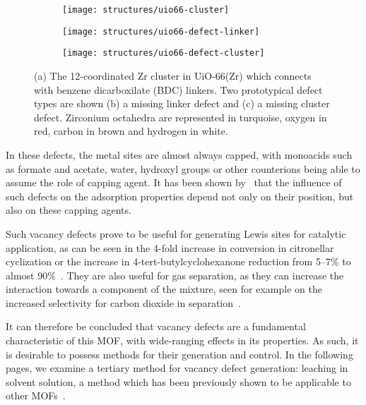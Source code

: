 \begin{figure}[htb]
	\centering

	\begin{subfigure}[b]{0.3\linewidth}
		\parbox[c]{0.15\linewidth}{\caption{}%
			\label{def:fig:uio66-cluster}}%
		\parbox[b]{0.85\linewidth}{%
			\texttt{[image: structures/uio66-cluster]}%
		}%
	\end{subfigure}
	\begin{subfigure}[b]{0.3\linewidth}
		\parbox[c]{0.15\linewidth}{\caption{}%
			\label{def:fig:uio66-defect-linker}}%
		\parbox[b]{0.85\linewidth}{%
			\texttt{[image: structures/uio66-defect-linker]}%
		}%
	\end{subfigure}
	\begin{subfigure}[b]{0.3\linewidth}
		\parbox[c]{0.15\linewidth}{\caption{}%
			\label{def:fig:uio66-defect-cluster}}%
		\parbox[b]{0.85\linewidth}{%
			\texttt{[image: structures/uio66-defect-cluster]}%
		}%
	\end{subfigure}

	\caption{(a) The 12-coordinated Zr cluster in UiO-66(Zr)
		which connects with benzene dicarboxilate (BDC) linkers.
		Two prototypical defect types are shown (b) a missing
		linker defect and (c) a missing cluster defect. Zirconium
		octahedra are represented in turquoise, oxygen in red,
		carbon in brown and hydrogen in white.}%
	\label{def:fig:uio66}

\end{figure}

In these defects, the metal sites are almost always capped,
with monoacids such as formate and acetate, water, hydroxyl groups
or other counterions being able
to assume the role of capping agent. It has been shown
by~\citet{thorntonDefectsMetalOrganic2016} that the influence
of such defects on the adsorption properties depend not only
on their position, but also on these capping
agents. 

Such vacancy defects prove to be useful for generating Lewis
sites for catalytic application, as can be seen in the 
4-fold increase in conversion in citronellar cyclization or
the increase in 4-tert-butylcyclohexanone reduction from 
5--7\% to almost 90\%~\cite{vermoorteleSynthesisModulationTool2013}.
They are also useful for gas separation, as they can increase the 
interaction towards a component of the mixture, seen for example
on the increased selectivity for carbon dioxide in 
separation~\cite{thorntonDefectsMetalOrganic2016}.

It can therefore be concluded that vacancy defects are a fundamental 
characteristic of this \gls{MOF}, with wide-ranging effects in its 
properties. As such, it is desirable to possess methods for their
generation and control. In the following pages, we examine a tertiary
method for vacancy defect generation: leaching in solvent
solution, a method which has been previously shown to be applicable
to other \glspl{MOF}~\cite{tuOrderedVacanciesTheir2014}.

